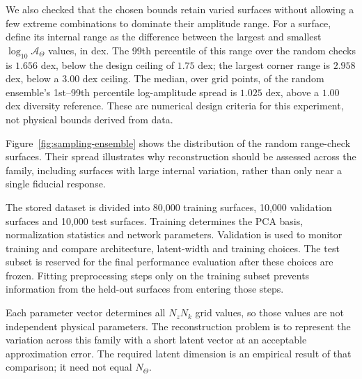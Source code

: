 We also checked that the chosen bounds retain varied surfaces without
allowing a few extreme combinations to dominate their amplitude range.
For a surface, define its internal range as the difference between the
largest and smallest $\log_{10}\mathcal A_\Theta$ values, in dex. The
99th percentile of this range over the random checks is $1.656$ dex,
below the design ceiling of $1.75$ dex; the largest corner range is
$2.958$ dex, below a $3.00$ dex ceiling. The median, over grid points,
of the random ensemble's 1st--99th percentile log-amplitude spread is
$1.025$ dex, above a $1.00$ dex diversity reference. These are numerical
design criteria for this experiment, not physical bounds derived from data.

Figure~\ref{fig:sampling-ensemble} shows the distribution of the random
range-check surfaces. Their spread illustrates why reconstruction should
be assessed across the family, including surfaces with large internal
variation, rather than only near a single fiducial response.


The stored dataset is divided into 80,000 training surfaces, 10,000
validation surfaces and 10,000 test surfaces. Training determines the PCA
basis, normalization statistics and network parameters. Validation is used
to monitor training and compare architecture, latent-width and training
choices. The test subset is reserved for the final performance evaluation
after these choices are frozen. Fitting preprocessing steps only on the
training subset prevents information from the held-out surfaces from
entering those steps.

Each parameter vector determines all $N_zN_k$ grid values, so those
values are not independent physical parameters. The
reconstruction problem is to represent the variation across this family
with a short latent vector at an acceptable approximation error. The
required latent dimension is an empirical result of that comparison; it
need not equal $N_\Theta$.
